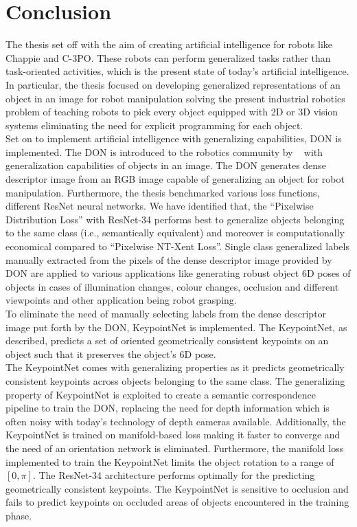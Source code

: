 \chapter{Conclusion}

The thesis set off with the aim of creating artificial intelligence for robots like Chappie and C-3PO.
These robots can perform generalized tasks rather than task-oriented activities, which is the present state of today's artificial intelligence.
In particular, the thesis focused on developing generalized representations of an object in an image for robot manipulation solving the present industrial robotics
problem of teaching robots to pick every object equipped with 2D or 3D vision systems eliminating the need for explicit programming for each object.\\

Set on to implement artificial intelligence with generalizing capabilities, \ac{DON} is implemented.
The \ac{DON} is introduced to the robotics community by  \citeauthor{florence2018dense}~\cite{florence2018dense} with generalization capabilities of objects in an image.
The \ac{DON} generates dense descriptor image from an \ac{RGB} image capable of generalizing an object for robot manipulation.
Furthermore, the thesis benchmarked various loss functions, different \ac{ResNet}
neural networks. We have identified that, the ``Pixelwise Distribution Loss'' with \ac{ResNet}-34 performs best to generalize objects belonging to the same class (i.e., semantically equivalent) and moreover is computationally
economical compared to ``Pixelwise NT-Xent Loss''.
Single class generalized labels manually extracted from the pixels of the dense descriptor image provided by \ac{DON} are applied to various applications like generating robust object 6D poses of objects in cases of illumination changes,
colour changes, occlusion and different viewpoints and other application being robot grasping.\\

To eliminate the need of manually selecting labels from the dense descriptor image put forth by the \ac{DON}, KeypointNet is implemented.
The KeypointNet, as described, predicts a set of oriented geometrically consistent keypoints on an object such that it preserves the object's 6D pose.\\

The KeypointNet comes with generalizing properties as it predicts geometrically consistent keypoints across objects belonging to the same class. The generalizing property
of KeypointNet is exploited to create a semantic correspondence pipeline to train the \ac{DON}, replacing the need for depth information which is often noisy with today's technology of depth cameras available.
Additionally, the KeypointNet is trained on manifold-based loss making it faster to converge and the need of an orientation network is eliminated.
Furthermore, the manifold loss implemented to train the KeypointNet limits the object rotation to a range of $[0, \pi]$. The \ac{ResNet}-34 architecture performs optimally for the predicting geometrically consistent keypoints.
The KeypointNet is sensitive to occlusion and fails to predict keypoints on occluded areas of objects encountered in the training phase. \\


